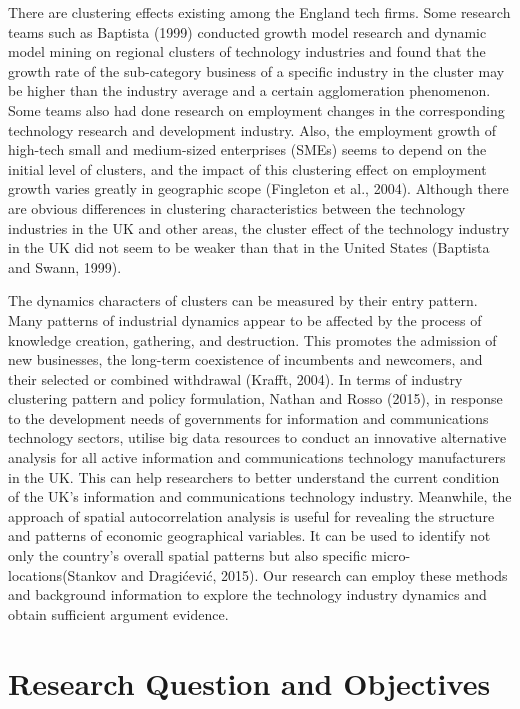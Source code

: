 \documentclass[
  12pt,
  oneside]{book}
\begin{document}
There are clustering effects existing among the England tech firms. Some research teams such as Baptista (1999) conducted growth model research and dynamic model mining on regional clusters of technology industries and found that the growth rate of the sub-category business of a specific industry in the cluster may be higher than the industry average and a certain agglomeration phenomenon. Some teams also had done research on employment changes in the corresponding technology research and development industry. Also, the employment growth of high-tech small and medium-sized enterprises (SMEs) seems to depend on the initial level of clusters, and the impact of this clustering effect on employment growth varies greatly in geographic scope (Fingleton et al., 2004). Although there are obvious differences in clustering characteristics between the technology industries in the UK and other areas, the cluster effect of the technology industry in the UK did not seem to be weaker than that in the United States (Baptista and Swann, 1999).

The dynamics characters of clusters can be measured by their entry pattern. Many patterns of industrial dynamics appear to be affected by the process of knowledge creation, gathering, and destruction. This promotes the admission of new businesses, the long-term coexistence of incumbents and newcomers, and their selected or combined withdrawal (Krafft, 2004). In terms of industry clustering pattern and policy formulation, Nathan and Rosso (2015), in response to the development needs of governments for information and communications technology sectors, utilise big data resources to conduct an innovative alternative analysis for all active information and communications technology manufacturers in the UK. This can help researchers to better understand the current condition of the UK's information and communications technology industry. Meanwhile, the approach of spatial autocorrelation analysis is useful for revealing the structure and patterns of economic geographical variables. It can be used to identify not only the country's overall spatial patterns but also specific micro-locations(Stankov and Dragićević, 2015). Our research can employ these methods and background information to explore the technology industry dynamics and obtain sufficient argument evidence.

\hypertarget{research-question-and-objectives}{%
\section{Research Question and Objectives}\label{research-question-and-objectives}}
\end{document}
